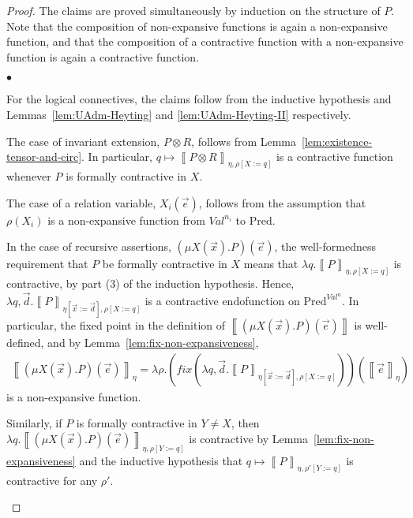 \documentclass{LMCS}
\theoremstyle{remark}
\newcommand{\Val}{\ensuremath{\mathit{Val}}\xspace}
\newcommand{\den}[1]{\left\llbracket #1
  \right\rrbracket}
\newcommand{\Pred}{\ensuremath{\mathrm{Pred}}\xspace}
\begin{document}
\begin{proof}
The claims are proved simultaneously by induction on the structure of $P$. 
Note that the composition of non-expansive functions is again a non-expansive function, and that the composition of a contractive function with a non-expansive function is again a contractive function. 
\begin{iteMize}{$\bullet$}
\item For the logical connectives, the claims follow from the inductive hypothesis and Lemmas~\ref{lem:UAdm-Heyting} and \ref{lem:UAdm-Heyting-II} respectively.
 
\item The case of invariant extension, $P\otimes R$, follows from Lemma~\ref{lem:existence-tensor-and-circ}. In particular, $q\mapsto \den{P\otimes R}_{\eta,\rho[X:=q]}$ is  a contractive function whenever $P$ is formally contractive in $X$. 

\item The case of a relation variable, $X_i(\vec e)$, follows from the assumption that $\rho(X_i)$ is a non-expansive function from $\Val^{n_i}$ to $\Pred$. 

\item In the case of recursive assertions, $(\mu X(\vec x).P)(\vec e)$, the well-formedness requirement that $P$ be formally contractive in $X$ means that 
$\lambda q. \den{P}_{\eta ,\rho[X:=q]}$ is contractive, by part (3) of the induction hypothesis. Hence, $\lambda q,\vec d. \den{P}_{\eta[\vec x:=\vec d],\rho[X:=q]}$ is a contractive endofunction on $\Pred^{\Val^n}$. 
In particular,  the fixed point in the definition of 
$\den{(\mu X(\vec x).P)(\vec e)}$ 
 is well-defined, and by Lemma~\ref{lem:fix-non-expansiveness}, 
\begin{align*}
\den{(\mu X(\vec x).P)(\vec e)}_{\eta} = \lambda\rho.(\textit{fix} (\lambda q,\vec d.\den{P}_{\eta[\vec x:=\vec d],\rho[X:=q]}))(\den{\vec e}_\eta)\end{align*}
 is a non-expansive function. 

Similarly, if $P$ is formally contractive in $Y\neq X$, then 
$\lambda q . \den{(\mu X(\vec x).P)(\vec e)}_{\eta,\rho[Y:=q]}$ is contractive by Lemma~\ref{lem:fix-non-expansiveness} and the inductive hypothesis that 
$q\mapsto\den{P}_{\eta,\rho'[Y:=q]}$ is contractive for any $\rho'$. 


\end{iteMize}
\end{proof}
\end{document}

